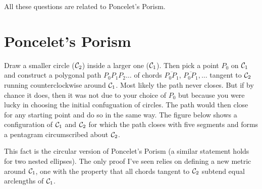 \documentclass{ximera}
\begin{document}
All these questions are related to Poncelet's Porism. 

\section*{Poncelet's Porism}




Draw a smaller circle (${\cal C}_2$) inside a larger one (${\cal C}_1$). Then pick a point $P_0$ on ${\cal C}_1$ and construct a polygonal path $P_0 P_1 P_2 \ldots$ of chords $\overline{P_0P_1}$, $\overline{P_0P_1}, \ldots$ tangent to ${\cal C}_2$ running counterclockwise around ${\cal C}_1$. Most likely the path never closes.  But if by chance it does, then it was not due to your choice of $P_0$ but because you were lucky in choosing the initial confuguation of circles. The path would then close for any starting point and do so in the same way. The figure below shows a configuration of ${\cal C}_1$ and ${\cal C}_2$ for which the path closes with five segments and forms a pentagram circumscribed about ${\cal C}_2$.


This fact is the circular version of Poncelet's Porism (a similar statement holds for two nested ellipses). The only proof I've seen relies on defining a new metric around ${\cal C}_1$, one with the property that all chords tangent to ${\cal C}_2$ subtend equal arclengths of ${\cal C}_1$. 
\end{document}
